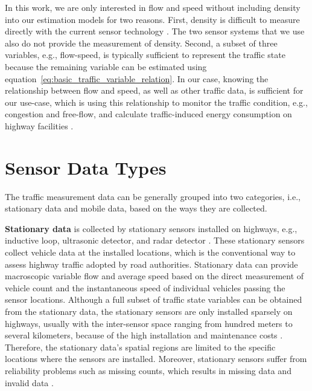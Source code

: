 \documentclass[english]{kththesis}
\begin{document}
In this work, we are only interested in flow and speed without including density into our estimation models for two reasons. First, density is difficult to measure directly with the current sensor technology \cite{elefteriadou_traffic_flow_theory}. The two sensor systems that we use also do not provide the measurement of density. Second, a subset of three variables, e.g., flow-speed, is typically sufficient to represent the traffic state because the remaining variable can be estimated using equation~\ref{eq:basic_traffic_variable_relation}. In our case, knowing the relationship between flow and speed, as well as other traffic data, is sufficient for our use-case, which is using this relationship to monitor the traffic condition, e.g., congestion and free-flow, and calculate traffic-induced energy consumption on highway facilities \cite{tsanakas_emission_estimation}.

\section{Sensor Data Types}
\label{sec:dataTypes}
The traffic measurement data can be generally grouped into two categories, i.e., stationary data and mobile data, based on the ways they are collected.

\textbf{Stationary data} is collected by stationary sensors installed on highways, e.g., inductive loop, ultrasonic detector, and radar detector \cite{seo_tse}. These stationary sensors collect vehicle data at the installed locations, which is the conventional way to assess highway traffic adopted by road authorities. Stationary data can provide macroscopic variable flow and average speed based on the direct measurement of vehicle count and the instantaneous speed of individual vehicles passing the sensor locations. Although a full subset of traffic state variables can be obtained from the stationary data, the stationary sensors are only installed sparsely on highways, usually with the inter-sensor space ranging from hundred meters to several kilometers, because of the high installation and maintenance costs \cite{seo_tse}. Therefore, the stationary data's spatial regions are limited to the specific locations where the sensors are installed. Moreover, stationary sensors suffer from reliability problems such as missing counts, which results in missing data and invalid data \cite{duan_dl_imputation, chen_imputation_regression}.
\end{document}
